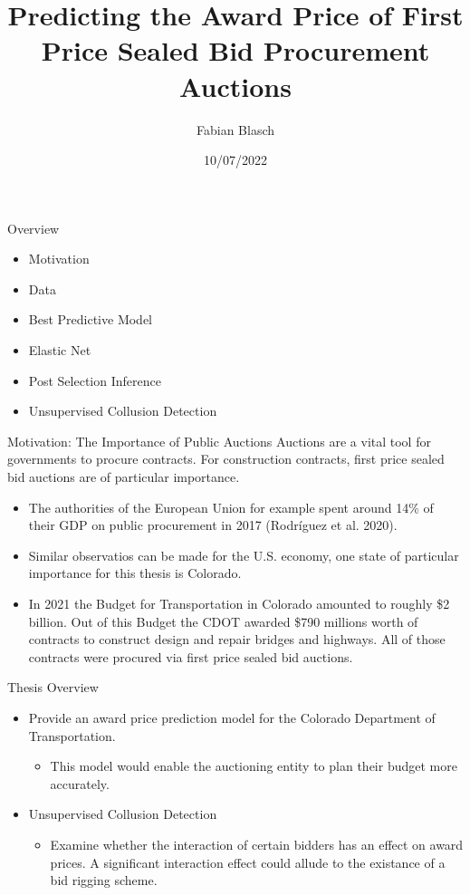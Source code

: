 \documentclass[
  11pt,
  ignorenonframetext,
]{beamer}
\title{Predicting the Award Price of First Price Sealed Bid Procurement
Auctions}
\author{Fabian Blasch}
\date{10/07/2022}
\providecommand{\tightlist}{%
  \setlength{\itemsep}{0pt}\setlength{\parskip}{0pt}}
\begin{document}
\frame{\titlepage}

\begin{frame}{Overview}
\protect\hypertarget{overview}{}
\begin{itemize}
\tightlist
\item
  Motivation
\item
  Data
\item
  Best Predictive Model
\item
  Elastic Net
\item
  Post Selection Inference
\item
  Unsupervised Collusion Detection
\end{itemize}
\end{frame}

\begin{frame}{Motivation: The Importance of Public Auctions}
\protect\hypertarget{motivation-the-importance-of-public-auctions}{}
Auctions are a vital tool for governments to procure contracts. For
construction contracts, first price sealed bid auctions are of
particular importance.

\begin{itemize}
\item
  The authorities of the European Union for example spent around 14\% of
  their GDP on public procurement in 2017 (Rodríguez et al. 2020).
\item
  Similar observatios can be made for the U.S. economy, one state of
  particular importance for this thesis is Colorado.
\item
  In 2021 the Budget for Transportation in Colorado amounted to roughly
  \$2 billion. Out of this Budget the CDOT awarded \$790 millions worth
  of contracts to construct design and repair bridges and highways. All
  of those contracts were procured via first price sealed bid auctions.
\end{itemize}
\end{frame}

\begin{frame}{Thesis Overview}
\protect\hypertarget{thesis-overview}{}
\begin{itemize}
\item
  Provide an award price prediction model for the Colorado Department of
  Transportation.

  \begin{itemize}
  \tightlist
  \item
    This model would enable the auctioning entity to plan their budget
    more accurately.
  \end{itemize}
\item
  Unsupervised Collusion Detection

  \begin{itemize}
  \tightlist
  \item
    Examine whether the interaction of certain bidders has an effect on
    award prices. A significant interaction effect could allude to the
    existance of a bid rigging scheme.
  \end{itemize}
\end{itemize}
\end{frame}
\end{document}
